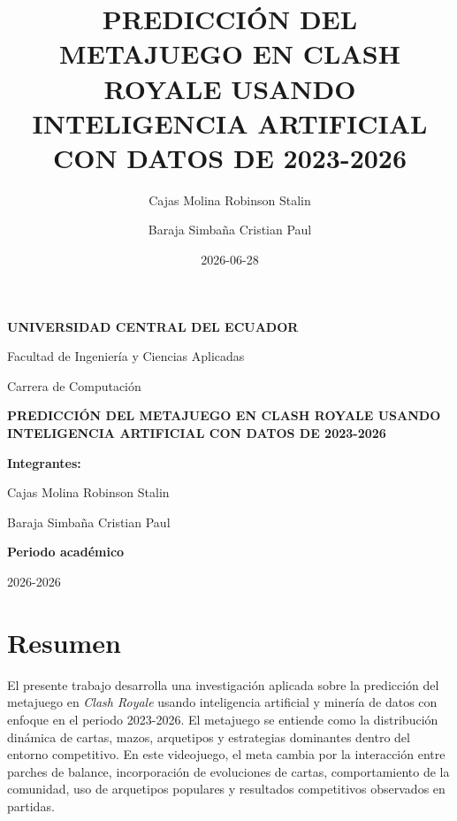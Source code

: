 \documentclass[
  spanish,
  12pt,
]{report}
\title{PREDICCIÓN DEL METAJUEGO EN CLASH ROYALE USANDO INTELIGENCIA
ARTIFICIAL CON DATOS DE 2023-2026}
\author{Cajas Molina Robinson Stalin \and Baraja Simbaña Cristian Paul}
\date{2026-06-28}
\let\maketitle\relax
\begin{document}
\maketitle


\begin{titlepage}
\begin{center}

\vspace*{1cm}

{\Large\textbf{UNIVERSIDAD CENTRAL DEL ECUADOR}}

\vspace{0.5cm}

{\large Facultad de Ingeniería y Ciencias Aplicadas}

\vspace{0.3cm}

{\large Carrera de Computación}

\vspace{2.5cm}

{\Huge\textbf{PREDICCIÓN DEL METAJUEGO EN CLASH ROYALE USANDO INTELIGENCIA ARTIFICIAL CON DATOS DE 2023-2026}}

\vspace{2.2cm}

\textbf{Integrantes:}

\vspace{0.3cm}

Cajas Molina Robinson Stalin

Baraja Simbaña Cristian Paul

\vfill

\textbf{Periodo académico}

2026-2026

\end{center}
\end{titlepage}

\tableofcontents
\newpage

\chapter*{Resumen}\label{resumen}

El presente trabajo desarrolla una investigación aplicada sobre la
predicción del metajuego en \emph{Clash Royale} usando inteligencia
artificial y minería de datos con enfoque en el periodo 2023-2026. El
metajuego se entiende como la distribución dinámica de cartas, mazos,
arquetipos y estrategias dominantes dentro del entorno competitivo. En
este videojuego, el meta cambia por la interacción entre parches de
balance, incorporación de evoluciones de cartas, comportamiento de la
comunidad, uso de arquetipos populares y resultados competitivos
observados en partidas.
\end{document}
